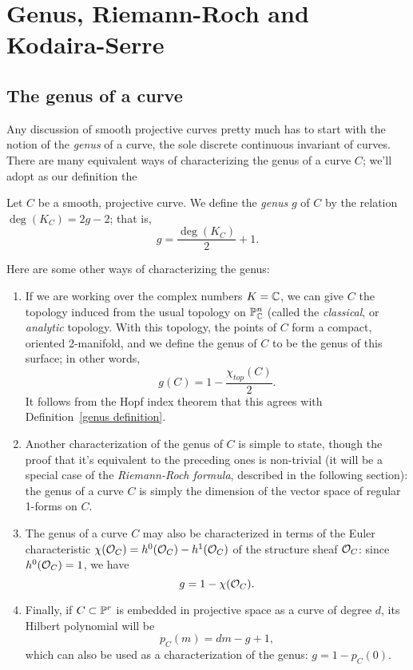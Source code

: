 \section{Genus, Riemann-Roch and Kodaira-Serre}

\subsection{The genus of a curve}

Any discussion of smooth projective curves pretty much has to start with the notion of the \emph{genus} of a curve, the sole discrete continuous invariant of curves. There are many equivalent ways of characterizing the genus of a curve $C$; we'll adopt as our definition the

\begin{definition}\label{genus definition}
Let $C$ be a smooth, projective curve. We define the \emph{genus} $g$ of $C$ by the relation $\deg(K_C) = 2g-2$; that is,
$$
g = \frac{\deg(K_C)}{2} + 1.
$$
\end{definition}

Here are some other ways of characterizing the genus:

\begin{enumerate}

\item If we are working over the complex numbers $K = \CC$, we can give $C$ the topology induced from the usual topology on $\PP^n_\CC$ (called the \emph{classical}, or \emph{analytic} topology. With this topology, the points of $C$ form a compact, oriented 2-manifold, and we define the genus of $C$ to be the genus of this surface; in other words,
$$
g(C) = 1 - \frac{\chi_{top}(C)}{2}.
$$
It follows from the Hopf index theorem that this agrees with Definition~\ref{genus definition}.

\item\label{genus 1forms} Another characterization of the genus of $C$ is simple to state, though the proof that it's equivalent to the preceding ones is non-trivial (it will be a special case of the \emph{Riemann-Roch formula}, described in the following section): the genus of a curve $C$ is simply the dimension of the vector space of regular 1-forms on $C$.

\item The genus of a curve $C$ may also be characterized in terms of the Euler characteristic $\chi(\cO_C) = h^0(\cO_C) - h^1(\cO_C)$ of the structure sheaf $\cO_C$: since $h^0(\cO_C) = 1$, we have
$$
g = 1 - \chi(\cO_C).
$$

\item\label{genus Hilbert} Finally, if $C \subset \PP^r$ is embedded in projective space as a curve of degree $d$, its Hilbert polynomial will be
$$
p_C(m) = dm - g + 1,
$$
which can also be used as a characterization of the genus: $g = 1 - p_C(0)$.

\end{enumerate}

